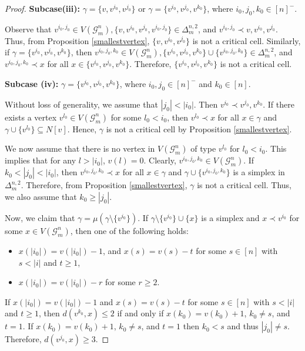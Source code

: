\documentclass{amsart}
\theoremstyle{definition}
\theoremstyle{remark}
\numberwithin{equation}{section}
\newcommand{\D}{\Delta}
\begin{document}
\begin{proof}
	
	
	
    \smallskip 
    
	\noindent\textbf{Subcase(iii):} $\gamma=\{v,v^{i_0},v^{j_0}\}$ or $\gamma=\{v^{i_0},v^{j_0},v^{k_0}\}$, where $i_0,j_0,k_0\in [n]^{-}$.
	
    \smallskip 
    
	\noindent
	Observe that $v^{i_0,j_0}\in V(\mathcal{G}_m^n), \{v,v^{i_0},v^{j_0}, v^{i_0,j_0}\} \in \Delta_m^{n,2}$,  and $v^{i_0,j_0}\prec v,v^{i_0},v^{j_0}$.  Thus, from Proposition \ref{smallestvertex}, $\{v,v^{i_0},v^{j_0}\}$ is not a critical cell. Similarly, if $\gamma=\{v^{i_0},v^{j_0},v^{k_0}\}$, then $v^{i_0,j_0,k_0}\in V(\mathcal{G}_m^n), \{v^{i_0},v^{j_0},v^{k_0}\}\cup \{v^{i_0,j_0,k_0}\} \in \Delta_m^{n,2}$, and $v^{i_0,j_0,k_0}\prec x$ for all $x\in \{v^{i_0},v^{j_0},v^{k_0}\}$.  Therefore, $\{v^{i_0},v^{j_0},v^{k_0}\}$ is not a critical cell. 
	
    \smallskip
	
	
    
	\noindent\textbf{Subcase (iv):} $\gamma=\{v^{i_0},v^{j_0},v^{k_0}\}$, where $i_0,j_0\in[n]^{-}$ and $k_0\in[n]$. 

    
    \smallskip 
    
	\noindent
	Without loss of generality, we assume that $|j_0|<|i_0|$. Then   $v^{i_0} \prec v^{j_0}, v^{k_0}$.
	If there exists a vertex $v^{l_0}\in V(\mathcal{G}_m^n)$ for some $l_0<i_0$, then $v^{l_0}\prec x$ for all $x\in\gamma$ and $\gamma \cup \{v^{l_0}\} \subseteq N[v]$. Hence, 
	$\gamma$ is not a critical cell by Proposition \ref{smallestvertex}. 
	
	We now assume that there is no vertex in $V(\mathcal{G}_m^n)$ of type $v^{l_0}$ for $l_0<i_0$. This implies that for any $l>|i_0|$, $v(l)=0$. Clearly, $v^{i_0,j_0,k_0}\in V(\mathcal{G}_m^n)$. 
	If $k_0<|j_0|<|i_0|$, then  $v^{i_0,j_0,k_0}\prec x$ for all $x\in \gamma$ and $\gamma\cup\{v^{i_0,j_0,k_0}\}$ is a simplex in $\D_m^{n,2}$. Therefore, from Proposition \ref{smallestvertex}, $\gamma$ is not a critical cell. Thus, we also assume that $k_0 \geq |j_0|$.
	
	Now,  we claim that $\gamma=\mu(\gamma\setminus \{v^{i_0}\})$.
	If $\gamma \setminus \{v^{i_0}\} \cup \{x\}$ is a simplex and $x \prec v^{i_0}$ for some $x \in V(\mathcal{G}_m^n)$, then one of the following holds:
	\begin{itemize}
		\item $x(|i_0|) = v(|i_0|) - 1$, and $x(s) = v(s) - t$ for some $s \in [n]$ with $s < |i|$ and $t \geq 1$, 
		\item $x(|i_0|) = v(|i_0|) - r$ for some $r \geq 2$.
	\end{itemize}
	If $x(|i_0|) = v(|i_0|) - 1$ and $x(s) = v(s) - t$ for some $s \in [n]$ with $s < |i|$ and $t \geq 1$, then $d(v^{k_0}, x) \leq 2$ if and only if $x(k_0)=v(k_0)+1$, $k_0\neq s$, and $t=1$. If $x(k_0)=v(k_0)+1$, $k_0\neq s$, and $t=1$ then $k_0<s$ and thus $|j_0|\neq s$. Therefore, $d(v^{j_0},x)\geq 3$.
    

\end{proof}
\end{document}
